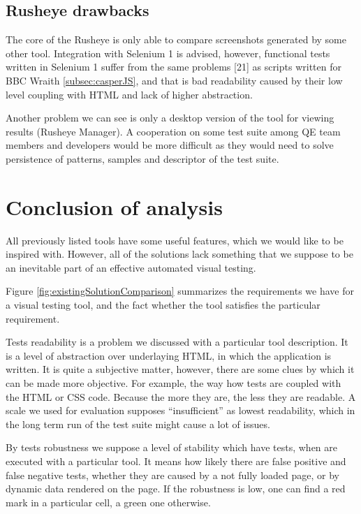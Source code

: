 \documentclass[11pt,oneside,final]{fithesis2}
\begin{document}
  \subsection{Rusheye drawbacks}
  The core of the Rusheye is only able to compare screenshots generated by some other tool. Integration with Selenium 1 is advised, however, functional tests written in Selenium 1 suffer
  from the same problems [21] as scripts written for BBC Wraith \ref{subsec:casperJS}, and that is bad readability caused by their low level coupling with HTML and lack of higher abstraction.
  
  Another problem we can see is only a desktop version of the tool for viewing results (Rusheye Manager). A cooperation on some test suite among QE team members and developers would be 
  more difficult as they would need to solve persistence of patterns, samples and descriptor of the test suite.
  
  \section{Conclusion of analysis}
  \label{chap:conclusion}
  All previously listed tools have some useful features, which we would like to be inspired with. However, all of the solutions lack something that we suppose to be an inevitable part of 
  an effective automated visual testing.
  
  Figure \ref{fig:existingSolutionComparison} summarizes the requirements we have for a visual testing tool, and the fact whether the tool satisfies the particular requirement.
  
  Tests readability is a problem we discussed with a particular tool description. It is a level of abstraction over underlaying HTML, in which the application is written. It is quite a subjective
  matter, however, there are some clues by which it can be made more objective. For example, the way how tests are coupled with the HTML or CSS code. Because the more they are, the less they 
  are readable. A scale we used for evaluation supposes ``insufficient'' as lowest readability, which in the long term run of the test suite might cause a lot of issues.
  
  By tests robustness we suppose a level of stability which have tests, when are executed with a particular tool. 
  It means how likely there are false positive and false negative tests, whether they are caused by a not fully loaded page, or by dynamic data rendered on the page. If the robustness is low,
  one can find a red mark in a particular cell, a green one otherwise.
  
\end{document}
